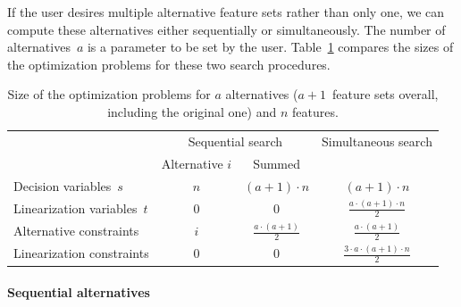 \documentclass{article}
\theoremstyle{definition}
\begin{document}
If the user desires multiple alternative feature sets rather than only one, we can compute these alternatives either sequentially or simultaneously.
The number of alternatives~$a$ is a parameter to be set by the user.
Table~\ref{tab:afs:seq-sim-comparison} compares the sizes of the optimization problems for these two search procedures.
%
\begin{table}[htb]
	\centering
	\renewcommand*{\arraystretch}{1.3}
	\begin{tabular}{lccc}
		\toprule
		& \multicolumn{2}{c}{Sequential search} & Simultaneous search \\
		\cmidrule(r){2-3}
		& Alternative $i$ & Summed & \\
		\midrule
		Decision variables~$s$ & $n$ & $ (a+1) \cdot n$ & $(a+1) \cdot n$ \\
		Linearization variables~$t$ & $0$ & $0$ & $\frac{a \cdot (a+1) \cdot n}{2}$ \\
		Alternative constraints & $i$ & $\frac{a \cdot (a+1)}{2}$ & $\frac{a \cdot (a+1)}{2}$ \\
		Linearization constraints & $0$ & $0$ & $\frac{3 \cdot a \cdot (a+1) \cdot n}{2}$ \\
		\bottomrule
	\end{tabular}
	\caption{Size of the optimization problems for $a$ alternatives ($a + 1$~feature sets overall, including the original one) and $n$ features.}
	\label{tab:afs:seq-sim-comparison}
\end{table}
%
\paragraph{Sequential alternatives}
\end{document}
